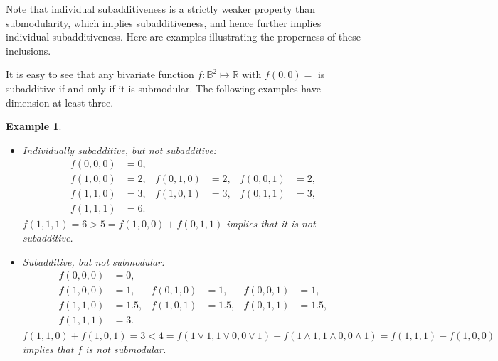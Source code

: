 \documentclass[11pt]{article}\usepackage[]{graphicx}\usepackage[]{xcolor}
\newtheorem{example}{Example}
\begin{document}
Note that individual subadditiveness is a strictly weaker property than submodularity, which implies subadditiveness, and hence further implies individual subadditiveness. Here are examples illustrating the properness of these inclusions.

It is easy to see that any bivariate function $f: \mathbb{B}^2\mapsto \mathbb{R}$ with $f(0,0)=$ is subadditive if and only if it is submodular. The following examples have dimension at least three.

\begin{example} 
\quad

\begin{itemize}
\item Individually subadditive, but not subadditive:
\[
\begin{aligned}
f(0,0,0) &= 0, \\
f(1,0,0) &= 2, & f(0,1,0) &= 2, & f(0,0,1) &= 2, \\
f(1,1,0) &= 3, & f(1,0,1) &= 3, & f(0,1,1) &= 3, \\
f(1,1,1) &= 6.
\end{aligned}
\]
$f(1,1,1)=6>5=f(1,0,0)+f(0,1,1)$ implies that it is not subadditive. 
\item Subadditive, but not submodular:
\[
\begin{aligned}
f(0,0,0) &= 0, \\
f(1,0,0) &= 1, & f(0,1,0) &= 1, & f(0,0,1) &= 1, \\
f(1,1,0) &= 1.5, & f(1,0,1) &= 1.5, & f(0,1,1) &= 1.5, \\
f(1,1,1) &= 3.
\end{aligned}
\]
$f(1,1,0)+f(1,0,1)=3<4=f(1\vee 1,1\vee 0, 0\vee 1)+f(1\wedge 1,1\wedge 0, 0\wedge 1)=f(1,1, 1)+f(1,0, 0)$ implies that $f$ is not submodular. 
\end{itemize}
\end{example}
\end{document}
